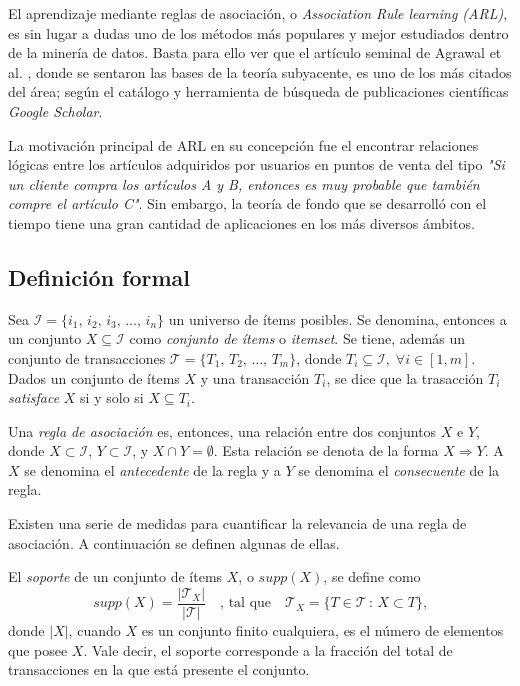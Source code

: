 El aprendizaje mediante reglas de asociación, o \textit{Association Rule learning (ARL)}, es sin lugar a dudas uno de los métodos más populares y mejor estudiados dentro de la minería de datos. Basta para ello ver que el artículo seminal de Agrawal et al. \cite{agrawal1993mining}, donde se sentaron las bases de la teoría subyacente, es uno de los más citados del área; según el catálogo y herramienta de búsqueda de publicaciones científicas \textit{Google Scholar}.

La motivación principal de ARL en su concepción fue el encontrar relaciones lógicas entre los artículos adquiridos por usuarios en puntos de venta del tipo \textit{"Si un cliente compra los artículos A y B, entonces es muy probable que también compre el artículo C"}. Sin embargo, la teoría de fondo que se desarrolló con el tiempo tiene una gran cantidad de aplicaciones en los más diversos ámbitos.

\subsection{Definición formal}

Sea $\mathcal{I} = \{i_1,\,i_2,\,i_3,\,\ldots ,\,i_n\}$ un universo de ítems posibles. Se denomina, entonces a un conjunto $X \subseteq \mathcal{I}$ como \textit{conjunto de ítems} o \textit{itemset}. Se tiene, además un conjunto de transacciones $\mathcal{T} = \{T_1,\,T_2,\,\ldots,\,T_m\}$, donde $T_i \subseteq \mathcal{I}, \; \forall i \in {[1,m]}$. Dados un conjunto de ítems $X$ y una transacción $T_i$, se dice que la trasacción $T_i$ \textit{satisface} $X$ si y solo si $X \subseteq T_i$.

Una \textit{regla de asociación} es, entonces, una relación entre dos conjuntos $X$ e $Y$, donde $X \subset \mathcal{I}$, $Y \subset \mathcal{I}$, y $X \cap Y = \emptyset$. Esta relación se denota de la forma $X \Rightarrow Y$. A $X$ se denomina el \textit{antecedente} de la regla y a $Y$ se denomina el \textit{consecuente} de la regla.

Existen una serie de medidas para cuantificar la relevancia de una regla de asociación. A continuación se definen algunas de ellas.

El \textit{soporte} de un conjunto de ítems $X$, o $\mathit{supp}(X)$, se define como $$\mathit{supp}(X) = \frac{|\mathcal{T}_X|}{|\mathcal{T}|} \quad \text{, tal que} \quad \mathcal{T}_X = \{T \in \mathcal{T} \, : \, X \subset T \}\text{,}$$ donde $|X|$, cuando $X$ es un conjunto finito cualquiera, es el número de elementos que posee $X$. Vale decir, el soporte corresponde a la fracción del total de transacciones en la que está presente el conjunto.

